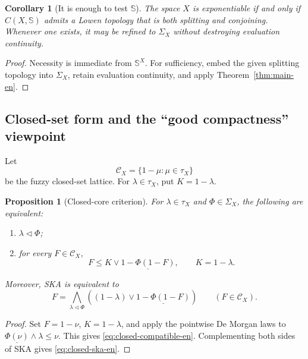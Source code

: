 \documentclass[11pt,a4paper]{article}
\numberwithin{equation}{section}
\newtheorem{proposition}[theorem]{Proposition}
\newtheorem{corollary}[theorem]{Corollary}
\theoremstyle{definition}
\theoremstyle{remark}
\newcommand{\Sier}{\mathbb S}
\newcommand{\const}[1]{\underline{#1}}
\begin{document}
\begin{corollary}[It is enough to test \(\Sier\)]\label{cor:sier-test-en}
The space \(X\) is exponentiable if and only if \(C(X,\Sier)\) admits a
Lowen topology that is both splitting and conjoining.  Whenever one
exists, it may be refined to \(\Sigma_X\) without destroying evaluation
continuity.
\end{corollary}

\begin{proof}
Necessity is immediate from \(\Sier^X\).  For sufficiency, embed the
given splitting topology into \(\Sigma_X\), retain evaluation
continuity, and apply Theorem~\ref{thm:main-en}.
\end{proof}

\subsection{Closed-set form and the ``good compactness'' viewpoint}

Let
\[
 \mathcal C_X=\{1-\mu:\mu\in\tau_X\}
\]
be the fuzzy closed-set lattice.  For \(\lambda\in\tau_X\), put
\(K=1-\lambda\).

\begin{proposition}[Closed-core criterion]\label{prop:closed-en}
For \(\lambda\in\tau_X\) and \(\Phi\in\Sigma_X\), the following are
equivalent:
\begin{enumerate}[label=(\roman*)]
 \item \(\lambda\triangleleft\Phi\);
 \item for every \(F\in\mathcal C_X\),
 \begin{equation}\label{eq:closed-compatible-en}
  F\leq K\vee\const{1-\Phi(1-F)},
  \qquad K=1-\lambda.
 \end{equation}
\end{enumerate}
Moreover, SKA is equivalent to
\begin{equation}\label{eq:closed-ska-en}
 F=\bigwedge_{\lambda\triangleleft\Phi}
   \left((1-\lambda)\vee\const{1-\Phi(1-F)}\right)
 \qquad(F\in\mathcal C_X).
\end{equation}
\end{proposition}

\begin{proof}
Set \(F=1-\nu\), \(K=1-\lambda\), and apply the pointwise De Morgan
laws to
\(\const{\Phi(\nu)}\wedge\lambda\leq\nu\).  This gives
\eqref{eq:closed-compatible-en}.  Complementing both sides of SKA gives
\eqref{eq:closed-ska-en}.
\end{proof}
\end{document}
